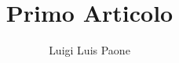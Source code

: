 \documentclass[]{scrartcl}
\title{Primo Articolo}
\author{Luigi Luis Paone}
\newcommand{\VAR}[1]{}
\begin{document}
\VAR{place_holder}
\end{document}

